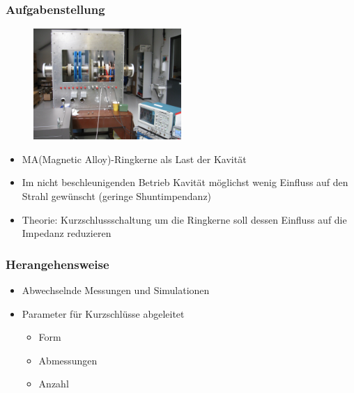 \documentclass[accentcolor=tud9b, colorbacktitle, inverttitle]{tudbeamer}
\begin{document}
\begin{frame}\frametitle{Aufgabenstellung}
\vspace{-1em}
\begin{multicols}{2}
	\begin{figure}[h]
		\centering
		\includegraphics[width=0.5\textwidth]{Kavitaet}
	\end{figure}
	\vfill\null
	\columnbreak
	\begin{itemize}
		\item MA(Magnetic Alloy)-Ringkerne als Last der Kavit\"at
		\item Im nicht beschleunigenden Betrieb Kavit\"at m\"oglichst wenig Einfluss auf den Strahl gewünscht (geringe Shuntimpendanz)
		\item Theorie: Kurzschlussschaltung um die Ringkerne soll dessen Einfluss auf die Impedanz reduzieren
	\end{itemize}
\end{multicols}
\end{frame}


\begin{frame}\frametitle{Herangehensweise}
\begin{itemize}
	\item Abwechselnde Messungen und Simulationen
	
	\item Parameter f\"ur Kurzschl\"usse abgeleitet
	\begin{itemize}
		\item Form
		\item Abmessungen
		\item Anzahl
	\end{itemize}
\end{itemize}
\end{frame}
\end{document}
